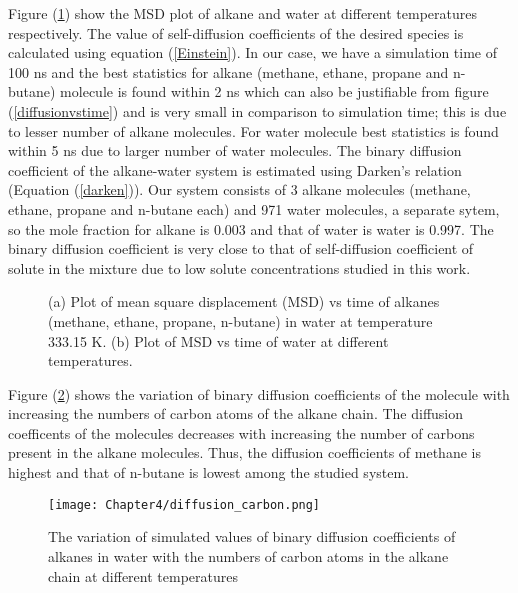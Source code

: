  Figure (\ref{msdalkanewater})  show the MSD plot of alkane  and water at different temperatures respectively. The value of self-diffusion coefficients of the desired species is calculated using equation (\ref{Einstein}).  In our case, we have a simulation time of 100 ns and the best statistics for alkane (methane, ethane, propane and n-butane) molecule is found within 2 ns which can also be justifiable from figure (\ref{diffusionvstime}) and is very small in comparison to simulation time; this is due to lesser number of alkane molecules. For water molecule best statistics is found within 5 ns due to larger number of water molecules. The binary diffusion coefficient of the alkane-water system is estimated using Darken's relation (Equation (\ref{darken})). Our system consists of 3 alkane molecules (methane, ethane, propane and n-butane each)  and 971 water molecules, a separate sytem, so the mole fraction for alkane is 0.003 and that of water is water is 0.997. The binary diffusion coefficient is  very close to that of self-diffusion coefficient of solute in the mixture due to low solute concentrations studied in this work.
 
  
 \begin{figure}[h!]
 \begin{center}
 \caption[Plot of mean square displacement (MSD) vs time of alkanes (methane, ethane, propane, n-butane) and water.] {(a) Plot of mean square displacement (MSD) vs time of alkanes (methane, ethane, propane, n-butane) in water at temperature 333.15 K. (b) Plot of MSD vs time of water at different temperatures.}
 \label{msdalkanewater}
 \end{center}
 \end{figure}
 
  Figure (\ref{carbon}) shows the variation of binary diffusion coefficients of the molecule with increasing the numbers of carbon atoms of the alkane chain. The diffusion coefficents of the molecules decreases with increasing the number of carbons present in the alkane molecules. Thus, the diffusion coefficients of methane is highest and that of n-butane is lowest among the studied system.

 \begin{figure}[h!]
 \centering
 \texttt{[image: Chapter4/diffusion\_carbon.png]}
 \caption[The variation of simulated values of binary diffusion coefficients  of alkanes in water  with the numbers of carbon atoms.] {The variation of simulated values of binary diffusion coefficients  of alkanes in water  with the numbers of carbon atoms in the alkane chain  at different temperatures } 
\label{carbon}
\end{figure}
 
